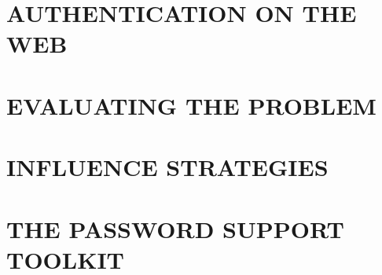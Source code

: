 \documentclass[12pt,a4paper]{book}
\begin{document}
\frontmatter
\maketitle
\tableofcontents

\mainmatter



\part{AUTHENTICATION ON THE WEB}


%
%





%

%


\part{EVALUATING THE PROBLEM}
 




\part{INFLUENCE STRATEGIES}

 


\part{THE PASSWORD SUPPORT TOOLKIT}


\end{document}
